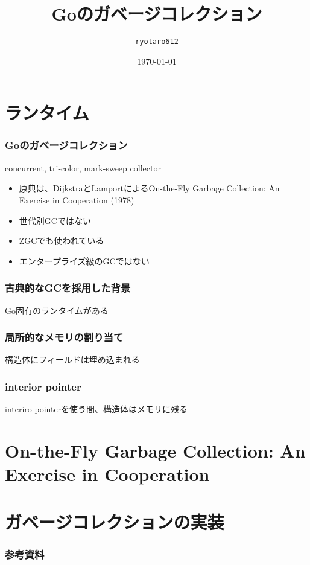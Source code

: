 \documentclass[unicode, 14pt, aspectratio=169]{beamer}
\date{\today}
\title{Goのガベージコレクション}
\author{\texttt{ryotaro612}}
\begin{document}
\begin{frame}
\titlepage
\end{frame}
\section{ランタイム}
\begin{frame}
  \frametitle{Goのガベージコレクション}
  {\large concurrent, tri-color, mark-sweep collector\supercite{go15gc}}
  \begin{itemize}
  \item 原典は、DijkstraとLamportによるOn-the-Fly Garbage Collection: An Exercise in Cooperation (1978)
  \item 世代別GCではない
  \item ZGCでも使われている
  \item エンタープライズ級のGCではない
  \end{itemize}
\end{frame}
\begin{frame}
  \frametitle{古典的なGCを採用した背景}
  {\large Go固有のランタイムがある}
\end{frame}
\begin{frame}
  \frametitle{局所的なメモリの割り当て}
  {\large 構造体にフィールドは埋め込まれる}
\end{frame}
\begin{frame}
  \frametitle{interior pointer}
  {\large interiro pointerを使う間、構造体はメモリに残る}
\end{frame}
\section{On-the-Fly Garbage Collection: An Exercise in Cooperation}
\section{ガベージコレクションの実装}
\begin{frame}[allowframebreaks,t]
  \frametitle{参考資料}
  \printbibliography
  \nocite{*}
\end{frame}
\end{document}
